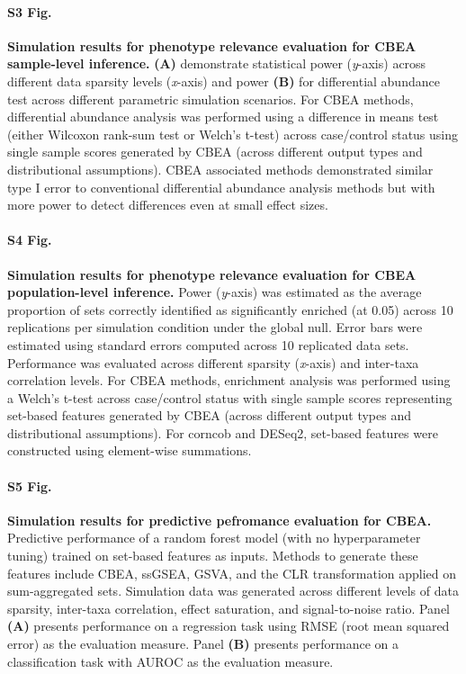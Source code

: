 \documentclass[10pt,letterpaper]{article}
\begin{document}
\paragraph*{S3 Fig.}
\label{S3_Fig}
{\bf Simulation results for phenotype relevance evaluation for CBEA sample-level inference.} \textbf{(A)} demonstrate statistical power (\emph{y}-axis) across different data sparsity levels (\emph{x}-axis) and power \textbf{(B)} for differential abundance test across different parametric simulation scenarios. For CBEA methods, differential abundance analysis was performed using a difference in means test (either Wilcoxon rank-sum test or Welch's t-test) across case/control status using single sample scores generated by CBEA (across different output types and distributional assumptions). CBEA associated methods demonstrated similar type I error to conventional differential abundance analysis methods but with more power to detect differences even at small effect sizes.

\paragraph*{S4 Fig.}
\label{S4_Fig}
{\bf Simulation results for phenotype relevance evaluation for CBEA population-level inference.} Power (\emph{y}-axis) was estimated as the average proportion of sets correctly identified as significantly enriched (at 0.05) across 10 replications per simulation condition under the global null. Error bars were estimated using standard errors computed across 10 replicated data sets. Performance was evaluated across different sparsity (\emph{x}-axis) and inter-taxa correlation levels. For CBEA methods, enrichment analysis was performed using a Welch's t-test across case/control status with single sample scores representing set-based features generated by CBEA (across different output types and distributional assumptions). For corncob and DESeq2, set-based features were constructed using element-wise summations.

\paragraph*{S5 Fig.}
\label{S5_Fig}
{\bf Simulation results for predictive pefromance evaluation for CBEA.} Predictive performance of a random forest model (with no hyperparameter tuning) trained on set-based features as inputs. Methods to generate these features include CBEA, ssGSEA, GSVA, and the CLR transformation applied on sum-aggregated sets. Simulation data was generated across different levels of data sparsity, inter-taxa correlation, effect saturation, and signal-to-noise ratio. Panel \textbf{(A)} presents performance on a regression task using RMSE (root mean squared error) as the evaluation measure. Panel \textbf{(B)} presents performance on a classification task with AUROC as the evaluation measure.  
\end{document}
